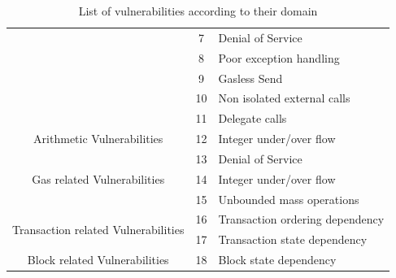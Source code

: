 \documentclass[a4paper,11pt]{article}
\begin{document}
\begin{table}[t]
\begin{center}
\begin{tabular}{||c|c|l||}
                                                                                & 7 & Denial of Service  \\ \cline{2-3}
                                                                                & 8 & Poor exception handling  \\ \cline{2-3}
                                                                                & 9 & Gasless Send  \\ \cline{2-3}
                                                                                & 10 & Non isolated external calls  \\ \cline{2-3}
                                                                                & 11 & Delegate calls \\ \cline{1-3}
                Arithmetic Vulnerabilities                                      & 12 & Integer under/over flow \\ \cline{1-3}
                \multirow{3}{*}{Gas related Vulnerabilities}                    & 13 & Denial of Service\\ \cline{2-3}
                                                                                & 14 & Integer under/over flow  \\ \cline{2-3}
                                                                                & 15 & Unbounded mass operations  \\ \cline{1-3}
                \multirow{2}{*}{Transaction related Vulnerabilities}            & 16 & Transaction ordering dependency\\ \cline{2-3}
                                                                                & 17 & Transaction state dependency  \\ \cline{1-3}
                Block related Vulnerabilities                                   & 18 & Block state dependency  \\ \cline{1-3}
            \end{tabular}
            \label{table:vulnerabilities}
            \caption{List of vulnerabilities according to their domain}
        \end{center}
\end{table}

\end{document}
